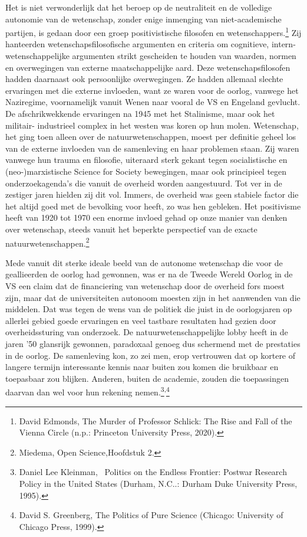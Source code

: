 \documentclass{jote-book}
\begin{document}
	Het is niet verwonderlijk dat het beroep op de neutraliteit en de volledige autonomie van de wetenschap, zonder enige inmenging van niet-academische partijen, is gedaan door een groep positivistische filosofen en wetenschappers.\footnote{David Edmonds, The Murder of Professor Schlick: The Rise and Fall of the Vienna Circle (n.p.: Princeton University Press, 2020).} Zij hanteerden wetenschapsfilosofische argumenten en criteria om cognitieve, intern-wetenschappelijke argumenten strikt gescheiden te houden van waarden, normen en overwegingen van externe maatschappelijke aard. Deze wetenschapsfilosofen hadden daarnaast ook persoonlijke overwegingen. Ze hadden allemaal slechte ervaringen met die externe invloeden, want ze waren voor de oorlog, vanwege het Naziregime, voornamelijk vanuit Wenen naar vooral de VS en Engeland gevlucht. De afschrikwekkende ervaringen na 1945 met het Stalinisme, maar ook het militair- industrieel complex in het westen was koren op hun molen. Wetenschap, het ging toen alleen over de natuurwetenschappen, moest per definitie geheel los van de externe invloeden van de samenleving en haar problemen staan. Zij waren vanwege hun trauma en filosofie, uiteraard sterk gekant tegen socialistische en (neo-)marxistische Science for Society bewegingen, maar ook principieel tegen onderzoekagenda's die vanuit de overheid worden aangestuurd. Tot ver in de zestiger jaren hielden zij dit vol. Immers, de overheid was geen stabiele factor die het altijd goed met de bevolking voor heeft, zo was hen gebleken. Het positivisme heeft van 1920 tot 1970 een enorme invloed gehad op onze manier van denken over wetenschap, steeds vanuit het beperkte perspectief van de exacte natuurwetenschappen.\footnote{Miedema, Open Science,Hoofdstuk 2. }



	Mede vanuit dit sterke ideale beeld van de autonome wetenschap die voor de geallieerden de oorlog had gewonnen, was er na de Tweede Wereld Oorlog in de VS een claim dat de financiering van wetenschap door de overheid fors moest zijn, maar dat de universiteiten autonoom moesten zijn in het aanwenden van die middelen. Dat was tegen de wens van de politiek die juist in de oorlogsjaren op allerlei gebied goede ervaringen en veel tastbare resultaten had gezien door overheidssturing van onderzoek. De natuurwetenschappelijke lobby heeft in de jaren '50 glansrijk gewonnen, paradoxaal genoeg dus schermend met de prestaties in de oorlog. De samenleving kon, zo zei men, erop vertrouwen dat op kortere of langere termijn interessante kennis naar buiten zou komen die bruikbaar en toepasbaar zou blijken. Anderen, buiten de academie, zouden die toepassingen daarvan dan wel voor hun rekening nemen.\footnote{Daniel Lee Kleinman,  Politics on the Endless Frontier: Postwar Research Policy in the United States (Durham, N.C..: Durham Duke University Press, 1995).}\textsuperscript{,}\footnote{David S. Greenberg, The Politics of Pure Science (Chicago: University of Chicago Press, 1999).}
\end{document}
